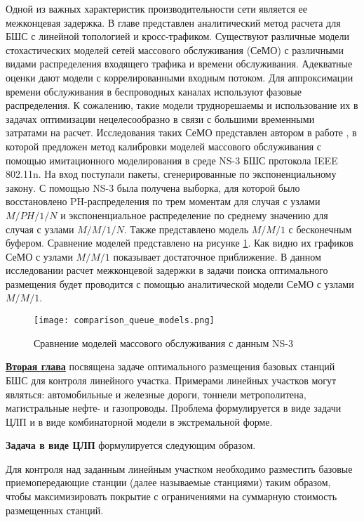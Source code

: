 Одной из важных характеристик производительности сети является ее межконцевая задержка. В главе представлен аналитический метод расчета для БШС с линейной топологией и кросс-трафиком. Существуют различные модели стохастических моделей сетей массового обслуживания (СеМО) с различными видами распределения входящего трафика и времени обслуживания. Адекватные оценки дают модели с коррелированными входным потоком. Для аппроксимации времени обслуживания в беспроводных каналах используют фазовые распределения. К сожалению, такие модели труднорешаемы и использование их в задачах оптимизации нецелесообразно в связи с большими временными затратами на расчет. Исследования таких СеМО представлен автором в работе \cite{Larionov2021}, в которой предложен метод калибровки моделей массового обслуживания с помощью имитационного моделирования в среде NS-3 БШС протокола IEEE 802.11n. На вход поступали пакеты, сгенерированные по экспоненциальному закону. С помощью NS-3 была получена выборка, для которой было восстановлено PH-распределения по трем моментам для случая с узлами $M/PH/1/N$ и экспоненциальное распределение по среднему значению для случая с узлами $M/M/1/N$. Также представлено модель $M/M/1$ с бесконечным буфером. Сравнение моделей представлено на рисунке \cref{fig:comparison_queue_models}. Как видно их графиков СеМО с узлами $M/M/1$ показывает достаточное приближение. В данном исследовании расчет межконцевой задержки в задачи поиска оптимального размещения будет проводится с помощью аналитической модели СеМО с узлами $M/M/1$.

\begin{figure}[h!]
  \centering
   \texttt{[image: comparison\_queue\_models.png]}
\caption{Сравнение моделей массового обслуживания с данным NS-3}
\label{fig:comparison_queue_models}
\end{figure}





\underline{\textbf{Вторая глава}} посвящена задаче оптимального размещения базовых станций БШС для контроля линейного участка. Примерами линейных участков могут являться: автомобильные и железные дороги, тоннели метрополитена, магистральные нефте- и газопроводы. Проблема формулируется в виде задачи ЦЛП и в виде комбинаторной модели в экстремальной форме.


\textbf{Задача в виде ЦЛП} формулируется следующим образом. 

Для контроля над заданным линейным участком необходимо разместить базовые приемопередающие станции (далее называемые станциями) таким образом, чтобы максимизировать покрытие с ограничениями на суммарную стоимость размещенных станций.


